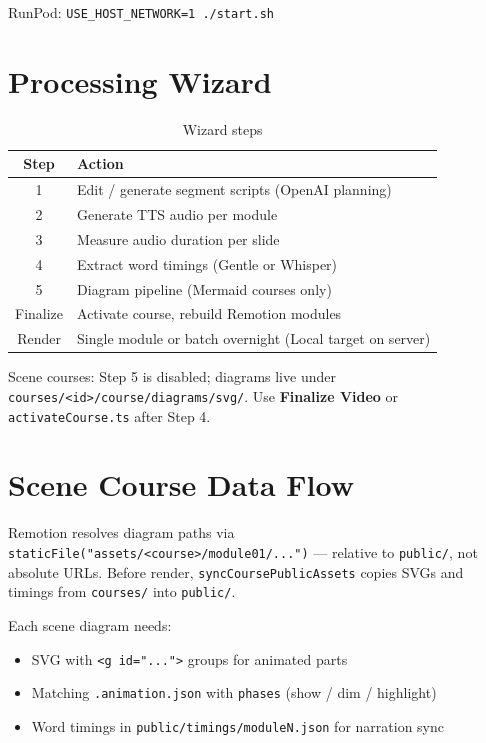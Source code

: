 \documentclass{scinexus}
\newcommand{\tableheadrow}[1]{\sffamily\bfseries\color{rbnavy} #1}
\begin{document}
RunPod: \texttt{USE\_HOST\_NETWORK=1 ./start.sh}

\section{Processing Wizard}

\diagramWizard

\begin{table}[htbp]
	\centering
	\footnotesize
	\caption{Wizard steps}
	\begin{tabularx}{\textwidth}{@{}c L@{}}
		\toprule
		\tableheadrow{Step} & \tableheadrow{Action} \\
		 & Edit / generate segment scripts (OpenAI planning) \\
		2 & Generate TTS audio per module \\
		3 & Measure audio duration per slide \\
		4 & Extract word timings (Gentle or Whisper) \\
		5 & Diagram pipeline (Mermaid courses only) \\
		Finalize & Activate course, rebuild Remotion modules \\
		Render & Single module or batch overnight (Local target on server) \\
		\bottomrule
	\end{tabularx}
\end{table}

Scene courses: Step 5 is disabled; diagrams live under \texttt{courses/<id>/course/diagrams/svg/}. Use \textbf{Finalize Video} or \texttt{activateCourse.ts} after Step 4.

\section{Scene Course Data Flow}

\diagramSceneCourse

Remotion resolves diagram paths via \texttt{staticFile("assets/<course>/module01/...")} --- relative to \texttt{public/}, not absolute URLs. Before render, \texttt{syncCoursePublicAssets} copies SVGs and timings from \texttt{courses/} into \texttt{public/}.

Each scene diagram needs:
\begin{itemize}
	\item SVG with \texttt{<g id="...">} groups for animated parts
	\item Matching \texttt{.animation.json} with \texttt{phases} (show / dim / highlight)
	\item Word timings in \texttt{public/timings/moduleN.json} for narration sync
\end{itemize}
\end{document}
